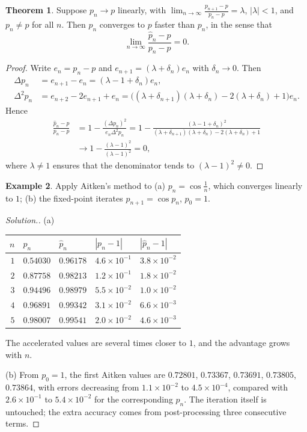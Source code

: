 \documentclass[11pt,a4paper]{article}
\numberwithin{equation}{section}
\theoremstyle{definition}
\newtheorem{thm}{Theorem}[subsection]
\newtheorem{exa}[thm]{Example}
\newenvironment{solution}
  {\renewcommand{\qedsymbol}{}\begin{proof}[\textit{Solution}.]}
  {\end{proof}}
\begin{document}
\begin{thm}
\label{thm:aitken}
Suppose $p_n\longrightarrow p$ linearly, with $\lim_{n\rightarrow\infty}\frac{p_{n+1}-p}{p_n-p} = \lambda$, $|\lambda|<1$, and $p_n\neq p$ for all $n$.
Then $\hat p_n$ converges to $p$ faster than $p_n$, in the sense that
$$\lim_{n\rightarrow\infty}\frac{\hat p_n-p}{p_n-p} = 0 .$$
\end{thm}

\begin{proof}
Write $e_n = p_n-p$ and $e_{n+1} = (\lambda+\delta_n)e_n$ with $\delta_n\longrightarrow0$. Then
\begin{align*}
\Delta p_n &= e_{n+1}-e_n = (\lambda-1+\delta_n)e_n,\\
\Delta^2p_n &= e_{n+2}-2e_{n+1}+e_n = \bigl((\lambda+\delta_{n+1})(\lambda+\delta_n)-2(\lambda+\delta_n)+1\bigr)e_n .
\end{align*}
Hence
\begin{align*}
\frac{\hat p_n-p}{p_n-p} &= 1-\frac{(\Delta p_n)^2}{e_n\Delta^2p_n} = 1-\frac{(\lambda-1+\delta_n)^2}{(\lambda+\delta_{n+1})(\lambda+\delta_n)-2(\lambda+\delta_n)+1}\\
&\longrightarrow1-\frac{(\lambda-1)^2}{(\lambda-1)^2} = 0,
\end{align*}
where $\lambda\neq1$ ensures that the denominator tends to $(\lambda-1)^2\neq0$.
\end{proof}

\begin{exa}
\label{exa:aitken}
Apply Aitken's method to (a) $p_n = \cos\frac1n$, which converges linearly to $1$; (b) the fixed-point iterates $p_{n+1} = \cos p_n$,
$p_0 = 1$.
\end{exa}

\begin{solution}
(a)
\begin{center}
\begin{tabular}{rllll}
\hline
$n$ & $p_n$ & $\hat p_n$ & $|p_n-1|$ & $|\hat p_n-1|$\\
\hline
$1$ & $0.54030$ & $0.96178$ & $4.6\times10^{-1}$ & $3.8\times10^{-2}$\\
$2$ & $0.87758$ & $0.98213$ & $1.2\times10^{-1}$ & $1.8\times10^{-2}$\\
$3$ & $0.94496$ & $0.98979$ & $5.5\times10^{-2}$ & $1.0\times10^{-2}$\\
$4$ & $0.96891$ & $0.99342$ & $3.1\times10^{-2}$ & $6.6\times10^{-3}$\\
$5$ & $0.98007$ & $0.99541$ & $2.0\times10^{-2}$ & $4.6\times10^{-3}$\\
\hline
\end{tabular}
\end{center}
The accelerated values are several times closer to $1$, and the advantage grows with $n$.

(b) From $p_0 = 1$, the first Aitken values are $0.72801$, $0.73367$, $0.73691$, $0.73805$, $0.73864$, with errors decreasing from
$1.1\times10^{-2}$ to $4.5\times10^{-4}$, compared with $2.6\times10^{-1}$ to $5.4\times10^{-2}$ for the corresponding $p_n$. The
iteration itself is untouched; the extra accuracy comes from post-processing three consecutive terms.
\end{solution}
\end{document}
